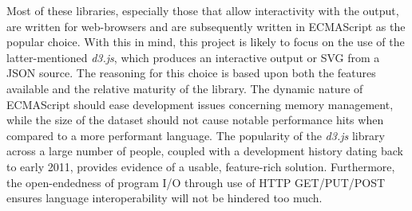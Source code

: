     
    Most of these libraries, especially those that allow interactivity with the output, are written for web-browsers and are subsequently written in ECMAScript as the popular choice.
    With this in mind, this project is likely to focus on the use of the latter-mentioned \textit{d3.js}, which produces an interactive output or SVG from a JSON source.
    The reasoning for this choice is based upon both the features available and the relative maturity of the library.
    The dynamic nature of ECMAScript should ease development issues concerning memory management, while the size of the dataset should not cause notable performance hits when compared to a more performant language.
    The popularity of the \textit{d3.js} library across a large number of people, coupled with a development history dating back to early 2011, provides evidence of a usable, feature-rich solution.
    Furthermore, the open-endedness of program I/O through use of HTTP GET/PUT/POST ensures language interoperability will not be hindered too much.
